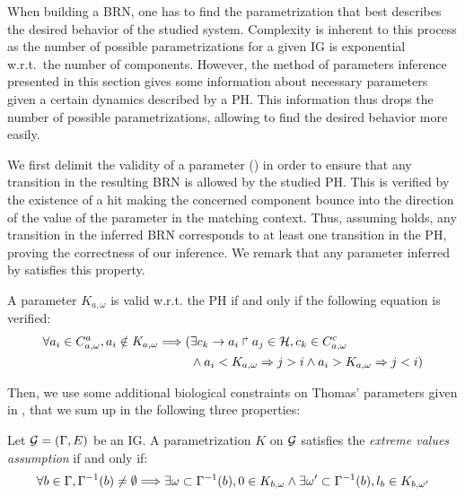 When building a BRN, one has to find the parametrization that best describes the desired behavior of the studied system.
Complexity is inherent to this process as the number of possible parametrizations for a given IG is exponential w.r.t.~the number of components.
However, the method of parameters inference presented in this section gives some information about necessary parameters given a certain dynamics described by a PH.
This information thus drops the number of possible parametrizations, allowing to find the desired behavior more easily.

We first delimit the validity of a parameter () in order to ensure that any
transition in the resulting BRN is allowed by the studied PH.
This is verified by the existence of a hit making the concerned component bounce into the direction
of the value of the parameter in the matching context.
Thus, assuming  holds, any transition in the inferred BRN corresponds to at least
one transition in the PH, proving the correctness of our inference.
We remark that any parameter inferred by  satisfies this property.

\begin{property}\label{pro:K-valid}
A parameter $K_{a,\omega}$ is valid w.r.t. the PH if and only if the following equation is verified:
\begin{align*}
  \forall a_i\in C^a_{a,\omega}, a_i \notin K_{a,\omega} \Longrightarrow
    (& \exists c_k\rightarrow a_i\Rsh a_j\in\mathcal{H}, c_k \in C^c_{a,\omega} \\
     & \wedge a_i < K_{a,\omega} \Rightarrow j > i \wedge  a_i > K_{a,\omega} \Rightarrow j <i )
\end{align*}
\end{property}

Then, we use some additional biological constraints on Thomas' parameters given in
\cite{BernotSemBRN}, that we sum up in the following three properties:

\begin{property}
Let $\mathcal{G} = (\Gamma, E)$ be an IG. A parametrization $K$ on $\mathcal{G}$ satisfies the \emph{extreme values assumption} if and only if:
\label{pro:param_enum_extreme}
\begin{align*}
  \forall b \in \Gamma, \Gamma^{-1}(b) \neq \emptyset \Longrightarrow \exists \omega \subset \Gamma^{-1}(b), 0 \in K_{b,\omega} \wedge \exists \omega' \subset \Gamma^{-1}(b), l_b \in K_{b,\omega'}
\end{align*}
\end{property}

